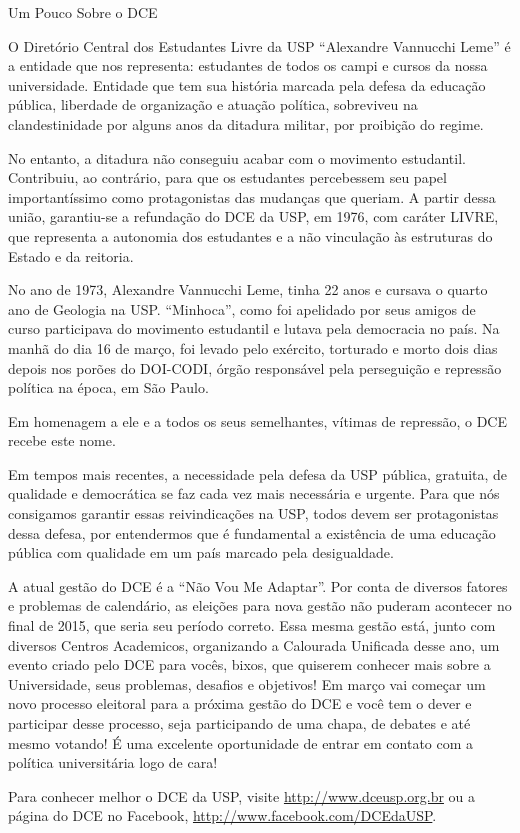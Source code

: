 \begin{secao}{Um Pouco Sobre o DCE}

O Diretório Central dos Estudantes Livre da USP ``Alexandre Vannucchi Leme'' é a
entidade que nos representa: estudantes de todos os campi e cursos da nossa universidade.
Entidade que tem sua história marcada pela defesa da educação pública, liberdade
de organização e atuação política, sobreviveu na clandestinidade por alguns anos
da ditadura militar, por proibição do regime.

No entanto, a ditadura não conseguiu acabar com o movimento estudantil. Contribuiu,
ao contrário, para que os estudantes percebessem seu papel importantíssimo como
protagonistas das mudanças que queriam. A partir dessa união, garantiu-se a
refundação do DCE da USP, em 1976, com caráter LIVRE, que representa a autonomia
dos estudantes e a não vinculação às estruturas do Estado e da reitoria.

No ano de 1973, Alexandre Vannucchi Leme, tinha 22 anos e cursava o quarto ano
de Geologia na USP. ``Minhoca'', como foi apelidado por seus amigos de curso participava
do movimento estudantil e lutava pela democracia no país. Na manhã do dia 16 de março,
foi levado pelo exército, torturado e morto dois dias depois nos porões do DOI-CODI,
órgão responsável pela perseguição e repressão política na época, em São Paulo.

Em homenagem a ele e a todos os seus semelhantes, vítimas de repressão, o DCE recebe este nome.

Em tempos mais recentes, a necessidade pela defesa da USP pública, gratuita, de qualidade
e democrática se faz cada vez mais necessária e urgente. Para que nós consigamos
garantir essas reivindicações na USP, todos devem ser protagonistas dessa defesa,
por entendermos que é fundamental a existência de uma educação pública com qualidade
em um país marcado pela desigualdade.

A atual gestão do DCE é a “Não Vou Me Adaptar”. Por conta de diversos fatores e
problemas de calendário, as eleições para nova gestão não puderam acontecer no
final de 2015, que seria seu período correto. Essa mesma gestão está, junto com
diversos Centros Academicos, organizando a Calourada Unificada desse ano, um
evento criado pelo DCE para vocês, bixos, que quiserem conhecer mais sobre a
Universidade, seus problemas, desafios e objetivos! Em março vai começar um
novo processo eleitoral para a próxima gestão do DCE e você tem o dever e
participar desse processo, seja participando de uma chapa, de debates e até
mesmo votando! É uma excelente oportunidade de entrar em contato com a política
universitária logo de cara!

Para conhecer melhor o DCE da USP, visite \url{http://www.dceusp.org.br} ou a página do DCE no Facebook,
\url{http://www.facebook.com/DCEdaUSP}.

\end{secao}
